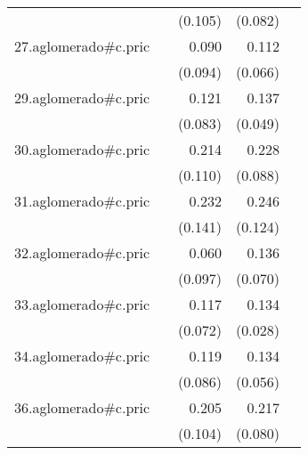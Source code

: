 {\begin{longtable}{l*{4}{D{.}{.}{-1}}}
            &                     &     (0.105)         &     (0.082)         &                     \\
\addlinespace
27.aglomerado#c.pric&                     &       0.090         &       0.112         &                     \\
            &                     &     (0.094)         &     (0.066)         &                     \\
\addlinespace
29.aglomerado#c.pric&                     &       0.121         &       0.137\sym{**} &                     \\
            &                     &     (0.083)         &     (0.049)         &                     \\
\addlinespace
30.aglomerado#c.pric&                     &       0.214         &       0.228\sym{**} &                     \\
            &                     &     (0.110)         &     (0.088)         &                     \\
\addlinespace
31.aglomerado#c.pric&                     &       0.232         &       0.246\sym{*}  &                     \\
            &                     &     (0.141)         &     (0.124)         &                     \\
\addlinespace
32.aglomerado#c.pric&                     &       0.060         &       0.136         &                     \\
            &                     &     (0.097)         &     (0.070)         &                     \\
\addlinespace
33.aglomerado#c.pric&                     &       0.117         &       0.134\sym{***}&                     \\
            &                     &     (0.072)         &     (0.028)         &                     \\
\addlinespace
34.aglomerado#c.pric&                     &       0.119         &       0.134\sym{*}  &                     \\
            &                     &     (0.086)         &     (0.056)         &                     \\
\addlinespace
36.aglomerado#c.pric&                     &       0.205\sym{*}  &       0.217\sym{**} &                     \\
            &                     &     (0.104)         &     (0.080)         &                     \\

\end{longtable}}
